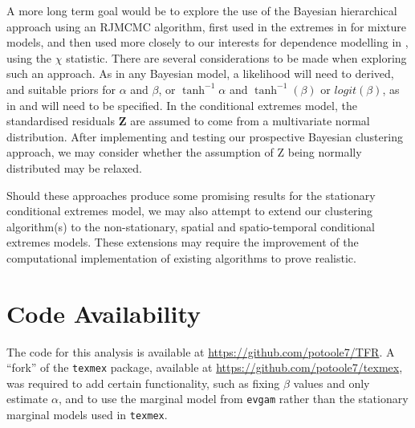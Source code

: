 \documentclass{article}
\numberwithin{equation}{section}
\begin{document}
A more long term goal would be to explore the use of the Bayesian hierarchical approach using an RJMCMC algorithm, first used in the extremes in \citet{Bottolo2003} for mixture models, and then used more closely to our interests for dependence modelling in \citet{Rohrbeck2021}, using the $\chi$ statistic.
There are several considerations to be made when exploring such an approach. 
As in any Bayesian model, a likelihood will need to derived, and suitable priors for $\alpha$ and $\beta$, or $\tanh^{-1}{\alpha}$ and $\tanh^{-1}(\beta)$ or $logit(\beta)$, as in \citet{Winter2016} and \citet{Richards2023} will need to be specified. 
In the conditional extremes model, the standardised residuals $\bm{Z}$ are assumed to come from a multivariate normal distribution. 
After implementing and testing our prospective Bayesian clustering approach, we may consider whether the assumption of Z being normally distributed may be relaxed.

Should these approaches produce some promising results for the stationary conditional extremes model, we may also attempt to extend our clustering algorithm(s) to the non-stationary, spatial and spatio-temporal conditional extremes models.
These extensions may require the improvement of the computational implementation of existing algorithms to prove realistic.

\section*{Code Availability}

The code for this analysis is available at \url{https://github.com/potoole7/TFR}.
A ``fork'' of the \texttt{texmex} package, available at \url{https://github.com/potoole7/texmex}, was required to add certain functionality, such as fixing $\beta$ values and only estimate $\alpha$, and to use the marginal model from \texttt{evgam} rather than the stationary marginal models used in \texttt{texmex}.


\newpage

\end{document}
